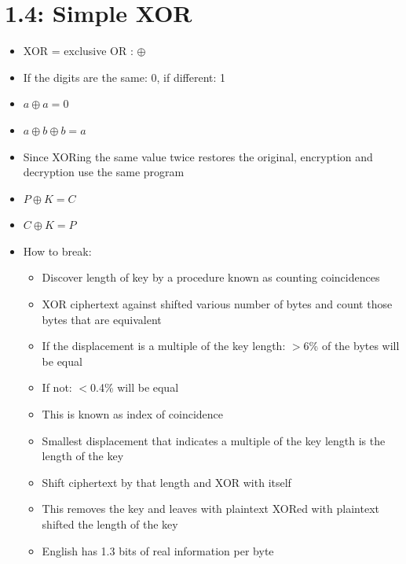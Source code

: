 \documentclass[]{article}
\begin{document}
\section{1.4: Simple XOR}
\begin{itemize}
    \item XOR = exclusive OR : $\oplus$
    \item If the digits are the same: 0, if different: 1
    \item $a \oplus a = 0$
    \item $a \oplus b \oplus b = a$
    \item Since XORing the same value twice restores the original, encryption and decryption use the same program
    \item $P \oplus K  = C$
    \item $C \oplus K  = P$
    \item How to break:
    \begin{itemize}
        \item Discover length of key by a procedure known as counting coincidences
        \item XOR ciphertext against shifted various number of bytes and count those bytes that are equivalent
        \item If the displacement is a multiple of the key length: $>$6\% of the bytes will be equal
        \item If not: $<$0.4\% will be equal
        \item This is known as index of coincidence
        \item Smallest displacement that indicates a multiple of the key length is the length of the key
        \item Shift ciphertext by that length and XOR with itself
        \item This removes the key and leaves with plaintext XORed with plaintext shifted the length of the key
        \item English has 1.3 bits of real information per byte
    \end{itemize}
\end{itemize}
\end{document}
